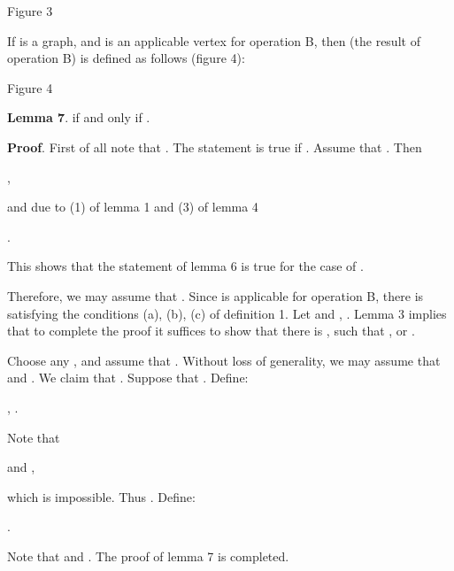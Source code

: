 \documentclass{article}
\begin{document}
\begin{center}

Figure 3\bigskip
\end{center}

If  is a graph, and  is an applicable vertex for operation B, then  (the result of operation B) is defined as follows (figure 4):

\begin{center}

\bigskip Figure 4
\end{center}

\textbf{Lemma 7}.  if and only if .

\textbf{Proof}. First of all note that .
The statement is true if . Assume that . Then

\begin{center}
,
\end{center}

and due to (1) of lemma 1 and (3) of lemma 4

\begin{center}
.
\end{center}

This shows that the statement of lemma 6 is true for the case of .

Therefore, we may assume that . Since  is applicable for
operation B, there is  satisfying the
conditions (a), (b), (c) of definition 1. Let  and , . Lemma 3 implies that to complete the proof it suffices
to show that there is , such that , or .

Choose any , and assume that . Without loss of generality,
we may assume that  and . We claim that .
Suppose that . Define:

\begin{center}
, .
\end{center}

Note that

\begin{center}
 and ,
\end{center}

which is impossible. Thus . Define:

\begin{center}
.
\end{center}

Note that  and . The proof of lemma
7 is completed.
\end{document}
